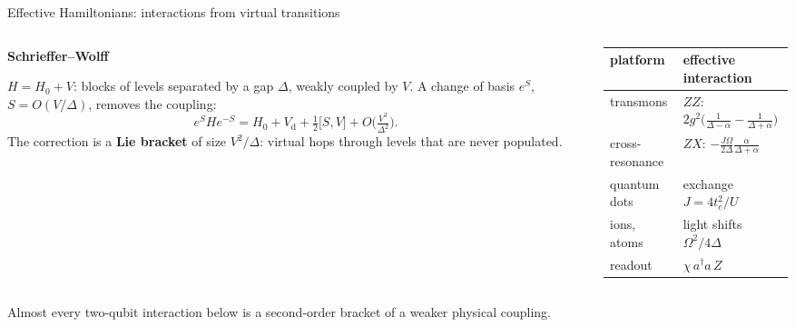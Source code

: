 \documentclass[aspectratio=169,11pt]{beamer}
\newcommand{\blocktitle}[1]{{\bfseries #1}\par\vskip1mm}
\begin{document}
\begin{frame}{Effective Hamiltonians: interactions from virtual transitions}
  \begin{columns}[T]
    \begin{column}{0.5\textwidth}
      \blocktitle{Schrieffer--Wolff}
      $H=H_0+V$: blocks of levels separated by a gap $\Delta$, weakly coupled by $V$. A change of basis $e^{S}$, $S=O(V/\Delta)$, removes the coupling:
      \[ e^{S}He^{-S}=H_0+V_{\mathrm d}+\tfrac12\big[S,V\big]+O\big(\tfrac{V^3}{\Delta^2}\big). \]
      The correction is a \textbf{Lie bracket} of size $V^2/\Delta$: virtual hops through levels that are never populated.
    \end{column}
    \begin{column}{0.46\textwidth}
      \centering\small
      \renewcommand{\arraystretch}{1.3}
      \begin{tabular}{@{}ll@{}}
        \toprule
        platform & effective interaction \\
        \midrule
        transmons & $ZZ$: $2g^2\big(\frac{1}{\Delta-\alpha}-\frac{1}{\Delta+\alpha}\big)$ \\
        cross-resonance & $ZX$: $-\frac{J\Omega}{2\Delta}\frac{\alpha}{\Delta+\alpha}$ \\
        quantum dots & exchange $J=4t_c^2/U$ \\
        ions, atoms & light shifts $\Omega^2/4\Delta$ \\
        readout & $\chi\,a^\dagger a\,Z$ \\
        \bottomrule
      \end{tabular}
    \end{column}
  \end{columns}
  \begin{takeaway}Almost every two-qubit interaction below is a second-order bracket of a weaker physical coupling.\end{takeaway}
\end{frame}
\end{document}
